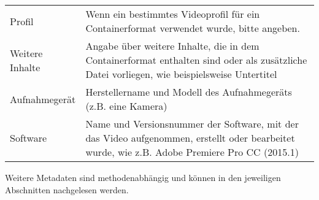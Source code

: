 \begin{center}
\begin{longtable}{L{0.3\textwidth} p{0.6\textwidth}}
		Profil & Wenn ein bestimmtes Videoprofil für ein Containerformat verwendet wurde, bitte angeben.\\
		Weitere Inhalte & Angabe über weitere Inhalte, die in dem Containerformat enthalten sind oder als zusätzliche Datei vorliegen, wie beispielsweise Untertitel\\
		Aufnahmegerät & Herstellername und Modell des Aufnahmegeräts (z.B. eine Kamera)\\
		Software & Name und Versionsnummer der Software, mit der das Video aufgenommen, erstellt oder bearbeitet wurde, wie z.B. Adobe Premiere Pro CC (2015.1)\\
	  \bottomrule
	\end{longtable}
\end{center}

Weitere Metadaten sind methodenabhängig und können in den jeweiligen Abschnitten nachgelesen werden.